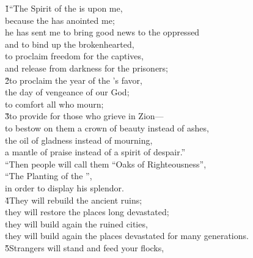 \begin{poetry}
\poeml {}
\v{1}``The Spirit of the  is upon me, \\
\poemll    because the  has anointed me; \\
\poeml he has sent me to bring good news to the oppressed \\
\poemll    and to bind up the brokenhearted, \\
\poeml to proclaim freedom for the captives, \\
\poemll    and release from darkness for the prisoners; \\
\poeml \v{2}to proclaim the year of the 's favor, \\
\poemll    the day of vengeance of our God; \\
\poemlll       to comfort all who mourn; \\
\poeml \v{3}to provide for those who grieve in Zion--- \\
\poemll    to bestow on them a crown of beauty instead of ashes, \\
\poeml the oil of gladness instead of mourning, \\
\poemll    a mantle of praise instead of a spirit of despair.'' \\
\poeml ``Then people will call them ``Oaks of Righteousness'', \\
\poemll    ``The Planting of the '', \\
\poemlll       in order to display his splendor. \\
\poeml \v{4}They will rebuild the ancient ruins; \\
\poemll    they will restore the places long devastated; \\
\poeml they will build again the ruined cities, \\
\poemll    they will build again the places devastated for many generations. \\
\poeml \v{5}Strangers will stand and feed your flocks, \\

\end{poetry}
